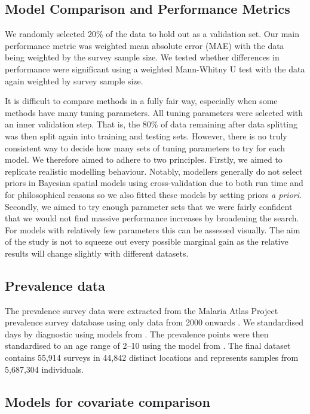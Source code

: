 \documentclass{bmcart}
\begin{document}
\subsection*{Model Comparison and Performance Metrics}


We randomly selected 20\% of the data to hold out as a validation set.
Our main performance metric was weighted mean absolute error (MAE) with the data being weighted by the survey sample size.
We tested whether differences in performance were significant using a weighted Mann-Whitny U test with the data again weighted by survey sample size.

It is difficult to compare methods in a fully fair way, especially when some methods have many tuning parameters.
All tuning parameters were selected with an inner validation step.
That is, the 80\% of data remaining after data splitting was then split again into training and testing sets.
However, there is no truly consistent way to decide how many sets of tuning parameters to try for each model.
We therefore aimed to adhere to two principles.
Firstly, we aimed to replicate realistic modelling behaviour.
Notably, modellers generally do not select priors in Bayesian spatial models using cross-validation due to both run time and for philosophical reasons so we also fitted these models by setting priors \emph{a priori}.
Secondly, we aimed to try enough parameter sets that we were fairly confident that we would not find massive performance increases by broadening the search.
For models with relatively few parameters this can be assessed visually.
The aim of the study is not to squeeze out every possible marginal gain as the relative results will change slightly with different datasets.

\subsection*{Prevalence data}

The prevalence survey data were extracted from the Malaria Atlas Project prevalence survey database using only data from 2000 onwards \cite{bhatt2015effect, guerra2007assembling, pfeffer2018ma}.
We standardised days by diagnostic using models from \cite{}.
The prevalence points were then standardised to an age range of 2--10 using the model from \cite{smith2007standardizing}.
The final dataset contains 55,914 surveys in 44,842 distinct locations and represents samples from 5,687,304 individuals.

\subsection*{Models for covariate comparison}
\end{document}
